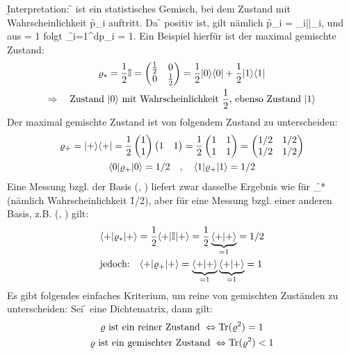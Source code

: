 \b{Interpretation:} \f{\varrho} ist ein statistisches Gemisch, bei dem Zustand  mit Wahrscheinlichkeit \f{p_i} auftritt. Da \f{\varrho} positiv ist, gilt nämlich \f{p_i = \langle\psi_i|\varrho|\psi_i\rangle{}}, und aus \f{\tr{\varrho} = 1} folgt \f{\sum_{i=1}^{d}p_i = 1}. Ein Beispiel hierfür ist der maximal gemischte Zustand:
\begin{gather*}
    \varrho_* = \frac{1}{2}\mathbb{I} = \begin{pmatrix}\frac{1}{2}&0\\0&\frac{1}{2}\end{pmatrix} = \frac{1}{2}|0\rangle\langle0|+\frac{1}{2}|1\rangle\langle1|\\
    \Rightarrow\quad\text{Zustand ${|0\rangle}$ mit Wahrscheinlichkeit ${\frac{1}{2}}$, ebenso Zustand ${|1\rangle}$}
\end{gather*}
Der maximal gemischte Zustand ist von folgendem Zustand zu unterscheiden:
\begin{gather*}
    \varrho_+ = |+\rangle\langle+| = \frac{1}{2}\begin{pmatrix}1\\1\end{pmatrix}\begin{pmatrix}1&1\end{pmatrix} = \frac{1}{2}\begin{pmatrix}1&1\\1&1\end{pmatrix} = \begin{pmatrix}1/2&1/2\\1/2&1/2\end{pmatrix}\\
    \langle0|\varrho_+|0\rangle = 1/2\quad,\quad\langle1|\varrho_+|1\rangle=1/2
\end{gather*}
Eine Messung bzgl. der Basis (, ) liefert zwar dasselbe Ergebnis wie für \f{\varrho_*} (nämlich Wahrscheinlichkeit \f{1/2}), aber für eine Messung bzgl. einer anderen Basis, z.B. (\ket{+}, \ket{-}) gilt:
\begin{align*}
    &\langle+|\varrho_*|+\rangle = \frac{1}{2}\langle+|\mathbb{I}|+\rangle = \frac{1}{2}\underbrace{\left\langle+|+\right\rangle}_{=1} = 1/2\\
    &\text{jedoch:}\quad\langle+|\varrho_+|+\rangle = \underbrace{\left\langle+|+\right\rangle}_{=1}\underbrace{\left\langle+|+\right\rangle}_{=1} = 1
\end{align*}
Es gibt folgendes einfaches Kriterium, um reine von gemischten Zuständen zu unterscheiden: Sei \f{\varrho} eine Dichtematrix, dann gilt:
\begin{gather*}
    \varrho \text{ ist ein reiner Zustand }\Leftrightarrow \text{Tr}(\varrho^2) = 1\\
    \varrho \text{ ist ein gemischter Zustand }\Leftrightarrow \text{Tr}(\varrho^2) < 1\\
\end{gather*}
